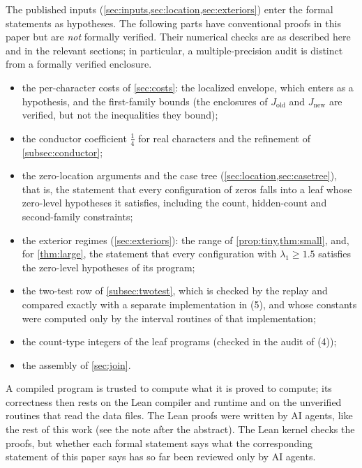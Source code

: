 The published inputs (\cref{sec:inputs,sec:location,sec:exteriors}) enter the formal
statements as hypotheses. The following parts have conventional proofs in this paper
but are \emph{not} formally verified. Their numerical checks are as described here and
in the relevant sections; in particular, a multiple-precision audit is distinct from
a formally verified enclosure.
\begin{itemize}
  \item the per-character costs of \cref{sec:costs}: the localized envelope, which enters as a
    hypothesis, and the first-family bounds (the enclosures of $J_{\mathrm{old}}$ and $J_{\mathrm{new}}$
    are verified, but not the inequalities they bound);
  \item the conductor coefficient $\frac14$ for real characters and the refinement of
    \cref{subsec:conductor};
  \item the zero-location arguments and the case tree (\cref{sec:location,sec:casetree}), that is, the
    statement that every configuration of zeros falls into a leaf whose zero-level hypotheses it
    satisfies, including the count, hidden-count and second-family constraints;
  \item the exterior regimes (\cref{sec:exteriors}): the range of \cref{prop:tiny,thm:small}, and,
    for \cref{thm:large}, the statement that every configuration with $\lambda_1\ge1.5$ satisfies the
    zero-level hypotheses of its program;
  \item the two-test row of \cref{subsec:twotest}, which is checked by the replay and compared
    exactly with a separate implementation in (5), and whose constants were computed only by the
    interval routines of that implementation;
  \item the count-type integers of the leaf programs (checked in the audit of (4));
  \item the assembly of \cref{sec:join}.
\end{itemize}
A compiled program is trusted to compute what it is proved to compute; its correctness then rests
on the Lean compiler and runtime and on the unverified routines that read the data files. The Lean
proofs were written by AI agents, like the rest of this work (see the note after the abstract).
The Lean kernel checks the proofs, but whether each formal statement says what the corresponding
statement of this paper says has so far been reviewed only by AI agents.

